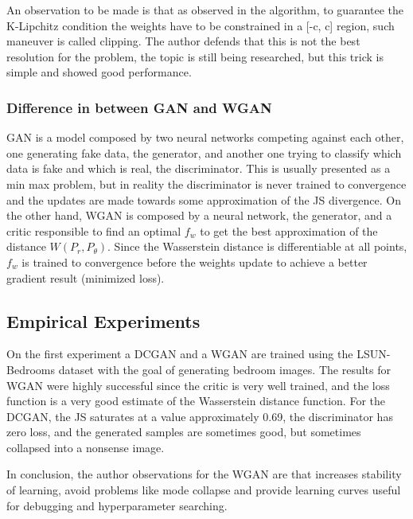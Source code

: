 An observation to be made is that as observed in the algorithm, to guarantee the K-Lipchitz condition the weights have to be constrained in a [-c, c] region, such maneuver is called clipping. The author defends that this is not the best resolution for the problem, the topic is still being researched, but this trick is simple and showed good performance.

\subsubsection{Difference in between GAN and WGAN}
GAN is a model composed by two neural networks competing against each other, one generating fake data, the generator, and another one trying to classify which data is fake and which is real, the discriminator. This is usually presented as a min max problem, but in reality the discriminator is never trained to convergence and the updates are made towards some approximation of the JS divergence. On the other hand, WGAN is composed by a neural network, the generator, and a critic responsible to find an optimal  $f_{w}$ to get the best approximation of the distance $W(P_{r},P_{\theta})$. Since the Wasserstein distance is differentiable at all points, $f_{w}$ is trained to convergence before the weights update to achieve a better gradient result (minimized loss).   



\subsection{Empirical Experiments}
On the first experiment a DCGAN and a WGAN are trained using the LSUN-Bedrooms dataset with the goal of generating bedroom images. The results for WGAN were highly successful since the critic is very well trained, and the loss function is a very good estimate of the Wasserstein distance function. For the DCGAN, the JS saturates at a value approximately 0.69, the discriminator has zero loss, and the generated samples are sometimes good, but sometimes collapsed into a nonsense image. 

In conclusion, the author observations for the WGAN are that increases stability of learning, avoid problems like mode collapse and provide learning curves useful for debugging and hyperparameter searching. 